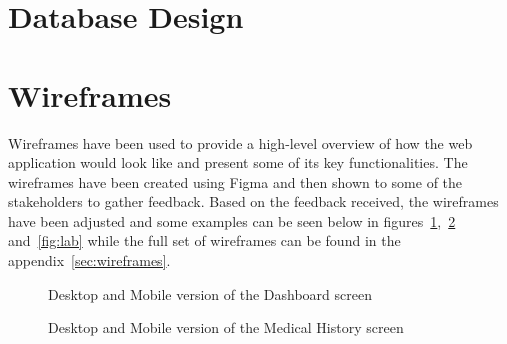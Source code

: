 \FloatBarrier{}

\noindent\begin{minipage}{\textwidth}
    \section{Database Design}
    \begin{center}
        \label{fig:erd}
    \end{center}
\end{minipage}

\FloatBarrier{}

\section{Wireframes}

Wireframes have been used to provide a high-level overview of how the web application would look like and present some of its key functionalities. The wireframes have been created using Figma and then shown to some of the stakeholders to gather feedback. Based on the feedback received, the wireframes have been adjusted and some examples can be seen below in figures~\ref{fig:dashboard},~\ref{fig:medhistory} and~\ref{fig:lab} while the full set of wireframes can be found in the appendix~\ref{sec:wireframes}.

\begin{figure}[ht]
    \centering
    \begin{minipage}[c]{0.70\textwidth}
    \end{minipage}
    \hspace{0.05\textwidth}
    \begin{minipage}[c]{0.20\textwidth}
    \end{minipage}
    \caption{Desktop and Mobile version of the Dashboard screen}\label{fig:dashboard}
\end{figure}

\begin{figure}[ht]
    \centering
    \begin{minipage}[c]{0.70\textwidth}
    \end{minipage}
    \hspace{0.05\textwidth}
    \begin{minipage}[c]{0.20\textwidth}
    \end{minipage}
    \caption{Desktop and Mobile version of the Medical History screen}\label{fig:medhistory}
\end{figure}

